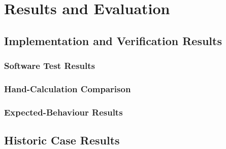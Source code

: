 \chapter{Results and Evaluation}
\label{chap:results}


\section{Implementation and Verification Results}
\label{sec:verification-results}

\subsection{Software Test Results}

\subsection{Hand-Calculation Comparison}

\subsection{Expected-Behaviour Results}

\section{Historic Case Results}
\label{sec:historic-results}


